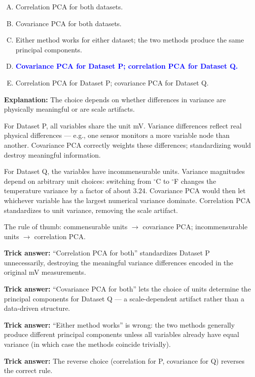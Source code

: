 \documentclass[12pt]{amsart}
\begin{document}
\begin{enumerate}[(A)]
\item Correlation PCA for both datasets.
\item Covariance PCA for both datasets.
\item Either method works for either dataset; the two methods produce the same principal components.
\item \textcolor{blue}{\textbf{Covariance PCA for Dataset P; correlation PCA for Dataset Q.}}
\item Correlation PCA for Dataset P; covariance PCA for Dataset Q.
\end{enumerate}

\textbf{Explanation:}
The choice depends on whether differences in variance are physically
meaningful or are scale artifacts.

For Dataset P, all variables share the unit mV. Variance differences reflect
real physical differences --- e.g., one sensor monitors a more variable node
than another. Covariance PCA correctly weights these differences;
standardizing would destroy meaningful information.

For Dataset Q, the variables have incommensurable units. Variance magnitudes
depend on arbitrary unit choices: switching from $^\circ$C to $^\circ$F changes
the temperature variance by a factor of about $3.24$. Covariance PCA would
then let whichever variable has the largest numerical variance dominate.
Correlation PCA standardizes to unit variance, removing the scale artifact.

The rule of thumb: commensurable units $\to$ covariance PCA;
incommensurable units $\to$ correlation PCA.

\textbf{Trick answer:}
``Correlation PCA for both'' standardizes Dataset P unnecessarily, destroying
the meaningful variance differences encoded in the original mV measurements.

\textbf{Trick answer:}
``Covariance PCA for both'' lets the choice of units determine the principal
components for Dataset Q --- a scale-dependent artifact rather than a
data-driven structure.

\textbf{Trick answer:}
``Either method works'' is wrong: the two methods generally produce different
principal components unless all variables already have equal variance
(in which case the methods coincide trivially).

\textbf{Trick answer:}
The reverse choice (correlation for P, covariance for Q) reverses the correct
rule.
\end{document}
